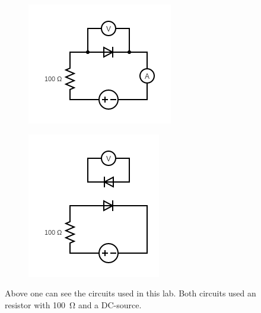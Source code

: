 \begin{figure}[H]
    \centering
    \begin{subfigure}{0.3\textwidth}
        \centering
        \includegraphics[width=\textwidth]{Figures/circuit_part1.png}
        \label{fig:part1_circuit}
    \end{subfigure}
    \hspace{2cm}
    \begin{subfigure}{0.3\textwidth}
        \centering
        \includegraphics[width=\textwidth]{Figures/circuit_part3.png}
        \label{fig:part3_circuit}
    \end{subfigure}
    \caption{Above one can see the circuits used in this lab. Both circuits used an resistor with \SI{100}{\ohm} and a DC-source. }
    \label{fig:circuits}
\end{figure}
